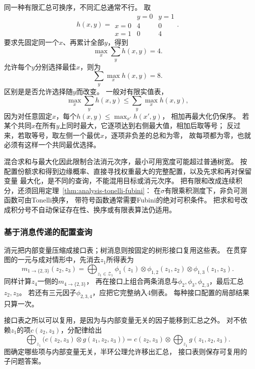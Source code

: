 同一种有限汇总可换序，不同汇总通常不行。
取
\[
  h(x,y)=
  \begin{array}{c|cc}
    &y=0&y=1\\ \hline
    x=0&4&0\\
    x=1&0&4
  \end{array}.
\]
要求先固定同一个\(x\)、再累计全部\(y\)，得到
\begin{equation}
  \max_x\sum_yh(x,y)=4.
  \label{eq:graph-theory-max-sum-order-a}
\end{equation}
允许每个\(y\)分别选择最佳\(x\)，则为
\begin{equation}
  \sum_y\max_xh(x,y)=8.
  \label{eq:graph-theory-max-sum-order-b}
\end{equation}
区别是是否允许选择随\(y\)而改变。
一般对有限实值表，
\[
  \max_x\sum_yh(x,y)\leq\sum_y\max_xh(x,y),
\]
因为对任意固定\(x\)，每个\(h(x,y)\leq\max_{x'}h(x',y)\)，
相加再最大化仍保序。
若某个共同\(x\)在所有\(y\)上同时最大，它逐项达到右侧最大值，相加后取等号；
反过来，若取等号，取左侧一个最优\(x\)，逐项非负差的总和为零，
故每项都为零，也就必须有这样一个共同最优选择。

混合求和与最大化因此限制合法消元次序，最小可用宽度可能超过普通树宽。
按配置份额求和得到边缘概率、直接寻找权重最大的完整配置，以及先求和再对保留变量
最大化，是不同的查询，不能混用目标或消元次序。
把有限和改成连续积分，还须回用定理~\ref{thm:analysis-tonelli-fubini}：
在\(\sigma\)有限乘积测度下，非负可测函数可由Tonelli换序，
带符号函数通常需要Fubini的绝对可积条件。
把求和号改成积分号不自动保证存在性、换序或有限表算法仍适用。

\subsubsection{基于消息传递的配置查询}

消元把内部变量压缩成接口表；树消息则按固定的树形接口复用这些表。
在贯穿图的一元与成对情形中，先消去\(z_1\)所得表为
\begin{equation}
  m_{1\to\{2,3\}}(z_2,z_3)=
  \bigoplus_{z_1\in\mathcal Z_1}
  \phi_1(z_1)\otimes\phi_{1,2}(z_1,z_2)\otimes\phi_{1,3}(z_1,z_3).
  \label{eq:graph-theory-interface-message}
\end{equation}
同样计算\(z_4\)一侧的\(m_{4\to\{2,3\}}\)，
再在接口上组合两条消息与\(\phi_2,\phi_3,\phi_{2,3}\)，最后汇总\(z_2,z_3\)。
若还有三元因子\(\phi_{2,3,4}\)，应把它完整纳入\(4\)侧表。
每种接口配置的局部结果只算一次。

接口表之所以可以复用，是因为与内部变量无关的因子能移到汇总之外。
对不依赖\(z_1\)的项\(c(z_2,z_3)\)，分配律给出
\[
  \bigoplus_{z_1}\bigl(c(z_2,z_3)\otimes g(z_1,z_2,z_3)\bigr)
  =c(z_2,z_3)\otimes\bigoplus_{z_1}g(z_1,z_2,z_3).
\]
图确定哪些项与内部变量无关，半环公理允许移出汇总，
接口表则保存可复用的子问题答案。

